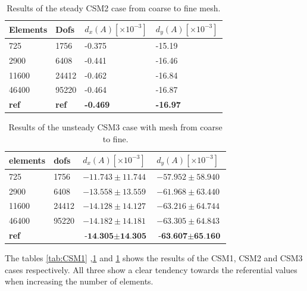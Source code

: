 \begin{table}[H]
\centering
\caption{Results of the steady CSM2 case from coarse to fine mesh.}
\label{tab:CSM2}
\begin{tabular}{@{}|l|l|l|l|@{}}
\hline
Elements & Dofs & $d_x(A) [\times10^{-3}] $& $d_y(A) [\times10^{-3}] $\\ \hline
725 &  1756 & -0.375 & -15.19 \\ \hline
2900 & 6408 & -0.441 & -16.46\\ \hline
11600 & 24412 & -0.462 & -16.84 \\ \hline
46400 & 95220 & -0.464 & -16.87\\ \hline
\textbf{ref} & \textbf{ref} &  \textbf{-0.469} &  \textbf{-16.97} \\ \hline
\end{tabular}
\end{table}


\begin{table}[H]
\centering
\caption{Results of the unsteady CSM3 case with mesh from coarse to fine.}
\label{tab:CSM3}
\begin{tabular}{|l|l|l|l|}
\hline
elements & dofs & $d_x(A) [\times10^{-3}]$ & $d_y(A)[\times10^{-3}]$ \\ \hline
725 & 1756 & $-11.743 \pm 11.744$ & $-57.952 \pm 58.940$ \\ \hline
2900 & 6408 & $-13.558 \pm 13.559$ & $ -61.968 \pm  63.440 $ \\ \hline
11600 & 24412 & $ -14.128 \pm 14.127$ & $-63.216 \pm 64.744 $ \\ \hline
46400 & 95220 & $ -14.182 \pm 14.181 $ & $ -63.305 \pm 64.843 $ \\ \hline
\textbf{ref} &  & $ \textbf{-14.305} \pm \textbf{14.305} $ & $ \textbf{-63.607} \pm  \textbf{65.160} $ \\ \hline
\end{tabular}
\end{table}

The tables \ref{tab:CSM1} ,\ref{tab:CSM2} and \ref{tab:CSM2} shows the results of the CSM1, CSM2 and CSM3 cases respectively. All three show a clear tendency towards the referential values when increasing the number of elements.

